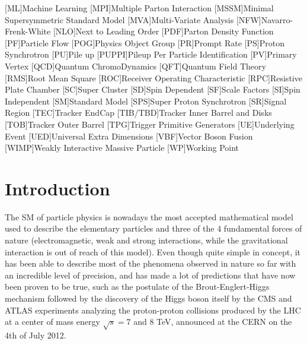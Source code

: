 \documentclass[a4paper, 10pt, openright]{report}
\begin{document}
\begin{multicols}{2}
\begin{acronym}
[ML]{Machine Learning}
[MPI]{Multiple Parton Interaction}
[MSSM]{Minimal Supersymmetric Standard Model}
[MVA]{Multi-Variate Analysis}
[NFW]{Navarro-Frenk-White}
[NLO]{Next to Leading Order}
[PDF]{Parton Density Function}
[PF]{Particle Flow}
[POG]{Physics Object Group}
[PR]{Prompt Rate}
[PS]{Proton Synchrotron}
[PU]{Pile up}
[PUPPI]{Pileup Per Particle Identification}
[PV]{Primary Vertex}
[QCD]{Quantum ChromoDynamics}
[QFT]{Quantum Field Theory}
[RMS]{Root Mean Square}
[ROC]{Receiver Operating Characteristic}
[RPC]{Resistive Plate Chamber}
[SC]{Super Cluster}
[SD]{Spin Dependent}
[SF]{Scale Factors}
[SI]{Spin Independent}
[SM]{Standard Model}
[SPS]{Super Proton Synchrotron}
[SR]{Signal Region}
[TEC]{Tracker EndCap} 
[TIB/TBD]{Tracker Inner Barrel and Disks}
[TOB]{Tracker Outer Barrel}
[TPG]{Trigger Primitive Generators}
[UE]{Underlying Event}
[UED]{Universal Extra Dimensions}
[VBF]{Vector Boson Fusion}
[WIMP]{Weakly Interactive Massive Particle}
[WP]{Working Point}

\end{acronym}
\end{multicols}
\newpage

\baselineskip
\tableofcontents
{}\baselineskip

\thispagestyle{empty}
\newpage


\clearpage
\thispagestyle{empty}
\phantom{a}
\vfill
\newpage

\setlength{\parskip}{8pt}

\chapter{Introduction}

The \acf{SM} of particle physics \cite{SM} is nowadays the most accepted mathematical model used to describe the elementary particles and three of the 4 fundamental forces of nature (electromagnetic, weak and strong interactions, while the gravitational interaction is out of reach of this model). Even though quite simple in concept, it has been able to describe most of the phenomena observed in nature so far with an incredible level of precision, and has made a lot of predictions that have now been proven to be true, such as the postulate of the Brout-Englert-Higgs mechanism \cite{HiggsPostulate1, HiggsPostulate2} followed by the discovery of the Higgs boson itself \cite{HiggsDiscovery1, HiggsDiscovery2} by the \ac{CMS} \cite{CMS} and \ac{ATLAS} \cite{ATLAS} experiments analyzing the proton-proton collisions produced by the \acf{LHC} at a center of mass energy $\sqrt{s} = 7$ and 8 TeV, announced at the \ac{CERN} on the 4th of July 2012. 
\end{document}
